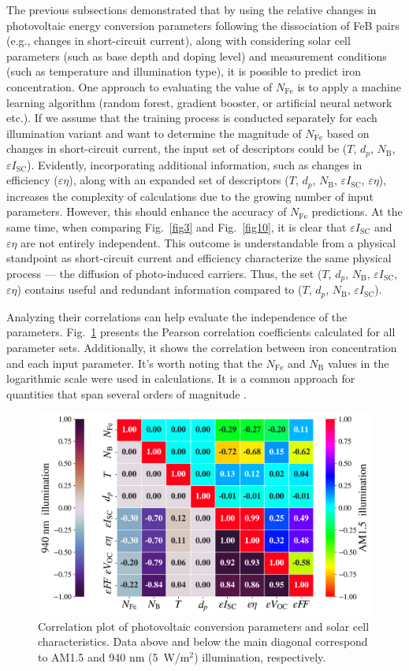 \documentclass[a4paper,fleqn]{cas-sc}
\begin{document}
The previous subsections demonstrated that by using the relative changes in photovoltaic energy conversion parameters following the dissociation of FeB pairs
(e.g., changes in short-circuit current),
along with considering solar cell parameters (such as base depth and doping level)
and measurement conditions (such as temperature and illumination type), it is possible to predict iron concentration.
One approach to evaluating the value of $N_\mathrm{Fe}$ is to apply a machine learning algorithm (random forest, gradient booster, or artificial neural network etc.).
If we assume that the training process is conducted separately for each illumination variant and want to
determine the magnitude of $N_\mathrm{Fe}$ based on changes in short-circuit current,
the input set of descriptors could be
($T$, $d_p$, $N_\mathrm{B}$, $\varepsilon I_\mathrm{SC}$).
Evidently, incorporating additional information, such as changes in efficiency ($\varepsilon \eta$), along with an expanded
set of descriptors ($T$, $d_p$, $N_\mathrm{B}$, $\varepsilon I_\mathrm{SC}$, $\varepsilon \eta$),
increases the complexity of calculations due to the growing number of input parameters.
However, this should enhance the accuracy of $N_\mathrm{Fe}$ predictions.
At the same time, when comparing Fig.~\ref{fig3} and Fig.~\ref{fig10}, it is clear that  $\varepsilon I_\mathrm{SC}$ and $\varepsilon \eta$ are not entirely independent.
This outcome is understandable from a physical standpoint as
short-circuit current and efficiency characterize the same physical process --- the diffusion of photo-induced carriers.
Thus, the set ($T$, $d_p$, $N_\mathrm{B}$, $\varepsilon I_\mathrm{SC}$, $\varepsilon \eta$)
contains useful and redundant information compared to ($T$, $d_p$, $N_\mathrm{B}$, $\varepsilon I_\mathrm{SC}$).

Analyzing their correlations can help evaluate the independence of the parameters.
Fig.~\ref{fig12} presents the Pearson correlation coefficients calculated for all parameter sets.
Additionally, it shows the correlation between iron concentration and each input parameter.
It's worth noting that the $N_\mathrm{Fe}$ and $N_\mathrm{B}$ values in the logarithmic scale were used in calculations.
It is a common approach for quantities that span several orders of magnitude \cite{Srivastava2023}.

\begin{figure}
	\centering
     \includegraphics[width=0.7\linewidth]{Fig12.png}
	  \caption{Correlation plot of photovoltaic conversion parameters and solar cell characteristics.
      Data above and below the main diagonal correspond to AM1.5 and 940 nm (5~W/m$^2$) illumination, respectively.
}\label{fig12}
\end{figure}
\end{document}
